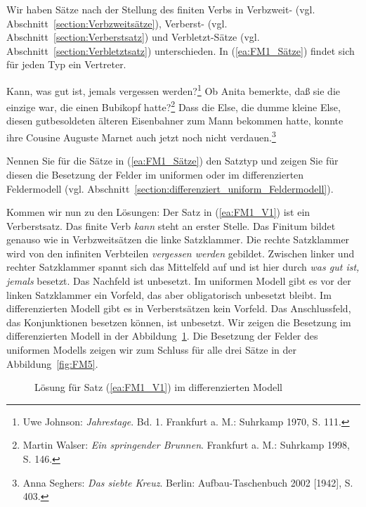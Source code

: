 Wir haben Sätze nach der Stellung des finiten Verbs in Verbzweit- (vgl. Abschnitt~\ref{section:Verbzweitsätze}), Verberst- (vgl. Abschnitt~\ref{section:Verberstsatz}) und Verbletzt-Sätze (vgl. Abschnitt~\ref{section:Verbletztsatz}) unterschieden. In (\ref{ea:FM1_Sätze}) findet sich für jeden Typ ein Vertreter. 

\ea \label{ea:FM1_Sätze}
\ea \label{ea:FM1_V1} Kann, was gut ist, jemals vergessen werden?\footnote{Uwe Johnson: \textit{Jahrestage}. Bd. 1. Frankfurt a. M.: Suhrkamp 1970, S. 111.}
\ex \label{ex:FM1_VLetzt} Ob Anita bemerkte, daß sie die einzige war, die einen Bubikopf hatte?\footnote{Martin Walser: \textit{Ein springender Brunnen}. Frankfurt a. M.: Suhrkamp 1998, S. 146.}
\ex \label{ex:FM1_V2} Dass die Else, die dumme kleine Else, diesen gutbesoldeten älteren Eisenbahner zum Mann bekommen hatte, konnte ihre Cousine Auguste Marnet auch jetzt noch nicht verdauen.\footnote{Anna Seghers: \textit{Das siebte Kreuz}. Berlin: Aufbau-Taschenbuch 2002 [1942], S. 403.}
\z 
\z  

Nennen Sie für die Sätze in (\ref{ea:FM1_Sätze}) den Satztyp und zeigen Sie für diesen die Besetzung der Felder im uniformen oder im differenzierten Feldermodell (vgl. Abschnitt~\ref{section:differenziert_uniform_Feldermodell}).


Kommen wir nun zu den Lösungen: Der Satz in (\ref{ea:FM1_V1}) ist ein Verberstsatz. Das finite Verb \textit{kann} steht an erster Stelle. Das Finitum bildet genauso wie in Verbzweitsätzen die linke Satzklammer. Die rechte Satzklammer wird von den infiniten Verbteilen \textit{vergessen werden} gebildet. Zwischen linker und rechter Satzklammer spannt sich das Mittelfeld auf und ist hier durch \textit{was gut ist, jemals} besetzt. Das Nachfeld ist unbesetzt. Im uniformen Modell gibt es vor der linken Satzklammer ein Vorfeld, das aber obligatorisch unbesetzt bleibt. Im differenzierten Modell gibt es in Verberstsätzen kein Vorfeld. Das Anschlussfeld, das Konjunktionen besetzen können, ist unbesetzt. Wir zeigen die Besetzung im differenzierten Modell in der Abbildung~\ref{fig:FM1}. Die Besetzung der Felder des uniformen Modells zeigen wir zum Schluss für alle drei Sätze in der Abbildung~\ref{fig:FM5}.

\begin{figure}[!htbp]
  \centering
  \caption{Lösung für Satz (\ref{ea:FM1_V1}) im differenzierten Modell}
  \label{fig:FM1}
\end{figure}   


